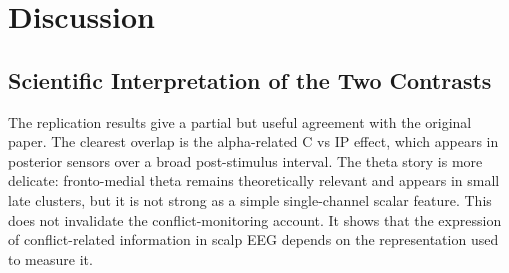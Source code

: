 \documentclass[11pt,a4paper,chapterprefix=false,parskip=false]{scrreprt}
\newcommand{\atc}[1]{\textcolor{red}{#1}}
\begin{document}





\chapter{Discussion}
\label{chap:discussion}

\section{Scientific Interpretation of the Two Contrasts}
The replication results give a partial but useful agreement with the original paper. The clearest overlap is the alpha-related C vs IP effect, which appears in posterior sensors over a broad post-stimulus interval. The theta story is more delicate: fronto-medial theta remains theoretically relevant and appears in small late clusters, but it is not strong as a simple single-channel scalar feature. This does not invalidate the conflict-monitoring account. It shows that the expression of conflict-related information in scalp EEG depends on the representation used to measure it.
\end{document}
